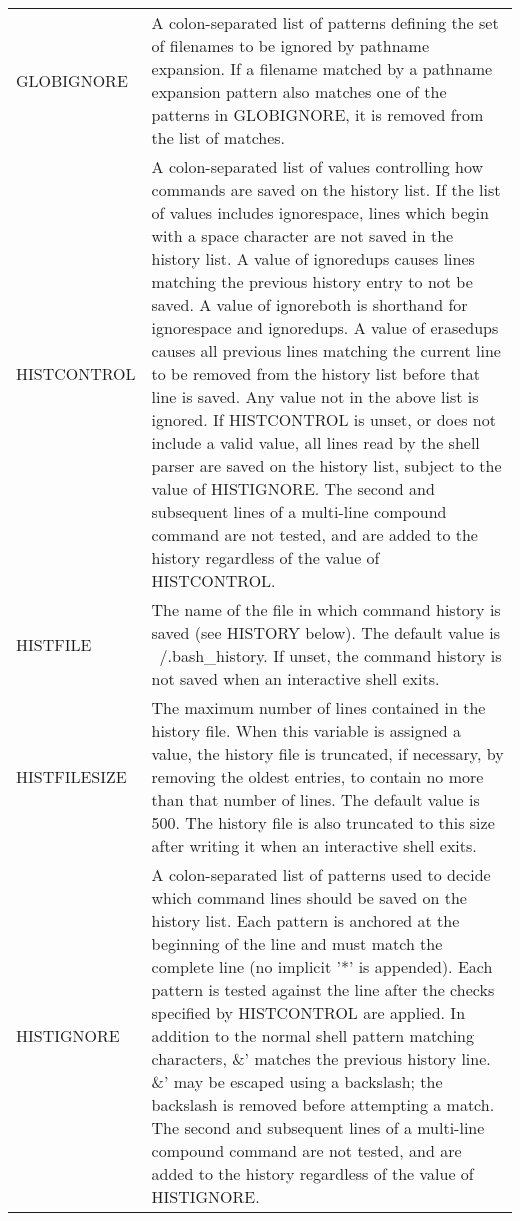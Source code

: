 \documentclass[11pt]{article}
\begin{document}
\begin{longtable}{p{}p{}}
GLOBIGNORE &
A colon-separated list of patterns defining the set of filenames to be ignored by pathname expansion. If a filename matched by a pathname expansion pattern also matches one of the patterns in GLOBIGNORE, it is removed from the list of matches. \\

HISTCONTROL &
A colon-separated list of values controlling how commands are saved on the history list. If the list of values includes ignorespace, lines which begin with a space character are not saved in the history list. A value of ignoredups causes lines matching the previous history entry to not be saved. A value of ignoreboth is shorthand for ignorespace and ignoredups. A value of erasedups causes all previous lines matching the current line to be removed from the history list before that line is saved. Any value not in the above list is ignored. If HISTCONTROL is unset, or does not include a valid value, all lines read by the shell parser are saved on the history list, subject to the value of HISTIGNORE. The second and subsequent lines of a multi-line compound command are not tested, and are added to the history regardless of the value of HISTCONTROL. \\

HISTFILE &
The name of the file in which command history is saved (see HISTORY below). The default value is ~/.bash\_history. If unset, the command history is not saved when an interactive shell exits. \\

HISTFILESIZE &
The maximum number of lines contained in the history file. When this variable is assigned a value, the history file is truncated, if necessary, by removing the oldest entries, to contain no more than that number of lines. The default value is 500. The history file is also truncated to this size after writing it when an interactive shell exits. \\

HISTIGNORE &
A colon-separated list of patterns used to decide which command lines should be saved on the history list. Each pattern is anchored at the beginning of the line and must match the complete line (no implicit '*' is appended). Each pattern is tested against the line after the checks specified by HISTCONTROL are applied. In addition to the normal shell pattern matching characters, \&' matches the previous history line. \&' may be escaped using a backslash; the backslash is removed before attempting a match. The second and subsequent lines of a multi-line compound command are not tested, and are added to the history regardless of the value of HISTIGNORE. \\


\end{longtable}
\end{document}
